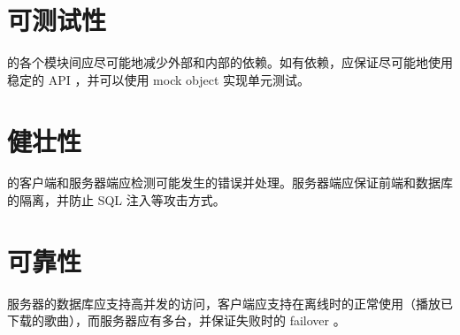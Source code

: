 \section {可测试性}
\proname 的各个模块间应尽可能地减少外部和内部的依赖。如有依赖，应保证尽可能地使用稳定的 API ，并可以使用 mock object 实现单元测试。

\section {健壮性}
\proname 的客户端和服务器端应检测可能发生的错误并处理。服务器端应保证前端和数据库的隔离，并防止 SQL 注入等攻击方式。

\section {可靠性}
\proname 服务器的数据库应支持高并发的访问，客户端应支持在离线时的正常使用（播放已下载的歌曲），而服务器应有多台，并保证失败时的 failover 。

